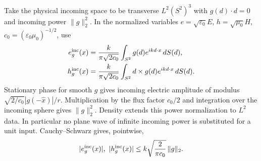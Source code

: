 Take the physical incoming space to be transverse $L^2(S^2)^3$ with
$g(d)\cdot d=0$ and incoming power $\|g\|_2^2$. In the normalized variables
$e=\sqrt{\varepsilon_0}E$, $h=\sqrt{\mu_0}H$,
$c_0=(\varepsilon_0\mu_0)^{-1/2}$, use
\begin{equation}
 \begin{split}
 e^{\rm inc}_g(x)&=\frac{k}{\pi\sqrt{2c_0}}
       \int_{S^2}g(d)e^{ikd\cdot x}\,dS(d),\\
 h^{\rm inc}_g(x)&=\frac{k}{\pi\sqrt{2c_0}}
       \int_{S^2}d\times g(d)e^{ikd\cdot x}\,dS(d).
 \end{split}
 \label{nr:herglotz}
\end{equation}
Stationary phase for smooth $g$ gives incoming electric amplitude of modulus
$\sqrt{2/c_0}|g(-\widehat x)|/r$. Multiplication by the flux factor
$c_0/2$ and integration over the incoming sphere gives $\|g\|_2^2$.
Density extends this power normalization to $L^2$ data. In particular no
plane wave of infinite incoming power is substituted for a unit input.
Cauchy--Schwarz gives, pointwise,
\begin{equation}
 |e_g^{\rm inc}(x)|,\ |h_g^{\rm inc}(x)|
 \leq k\sqrt{\frac{2}{\pi c_0}}\,\|g\|_2.
 \label{nr:incidentbound}
\end{equation}

